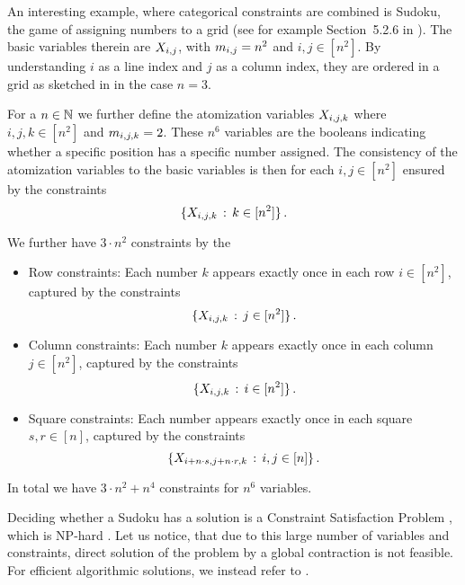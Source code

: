\begin{example}[Sudoku]
    \label{exa:sudoku}
    An interesting example, where categorical constraints are combined is Sudoku, the game of assigning numbers to a grid (see for example Section~5.2.6 in \cite{russell_artificial_2021}).
    The basic variables therein are $X_{i,j}$, with $m_{i,j}=n^2$ and $i,j\in[n^2]$.
    By understanding $i$ as a line index and $j$ as a column index, they are ordered in a grid as sketched in  in the case $n=3$.

    For a $n\in\mathbb{N}$ we further define the atomization variables $X_{i,j,k}$ where $i,j,k\in[n^2]$ and $m_{i,j,k}=2$.
    These $n^6$ variables are the booleans indicating whether a specific position has a specific number assigned.
    The consistency of the atomization variables to the basic variables is then for each $i,j\in[n^2]$ ensured by the constraints
    \[ \{X_{i,j,k} \, : \, k\in [n^2] \} \, . \]

    We further have $3\cdot n^2$ constraints by the
    \begin{itemize}
        \item Row constraints: Each number $k$ appears exactly once in each row $i\in[n^2]$, captured by the constraints
        \[ \{X_{i,j,k}  \, : \, j \in [n^2] \} \, . \]
        \item Column constraints: Each number $k$ appears exactly once in each column $j\in[n^2]$, captured by the constraints
        \[ \{X_{i,j,k}  \, : \, i \in [n^2] \} \, . \]
        \item Square constraints: Each number appears exactly once in each square $s,r\in[n]$, captured by the constraints
        \[ \{X_{i+n\cdot s,j+n\cdot r,k}  \, : \, i,j \in [n] \} \, . \]
    \end{itemize}

    In total we have $3\cdot n^2 + n^4$ constraints for $n^6$ variables.

    Deciding whether a Sudoku has a solution is a Constraint Satisfaction Problem \cite{simonis_sudoku_2005}, which is NP-hard \cite{agerbeck_multi-agent_2008}.
    Let us notice, that due to this large number of variables and constraints, direct solution of the problem by a global contraction is not feasible.
    For efficient algorithmic solutions, we instead refer to .


\end{example}
